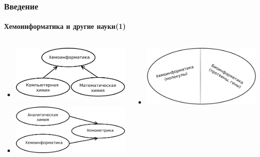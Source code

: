 \begin{frame}
  \frametitle{Введение}
  \framesubtitle{Хемоинформатика и другие науки(1)}
  \begin{columns}
    \begin{column}{0.5\textwidth}
      \begin{itemize}
   \item  \includegraphics[scale=0.32]{images/Diagram1.pdf}
   \item  \includegraphics[scale=0.3]{images/Diagram3.pdf}
      \end{itemize}
    \end{column}
    \begin{column}{0.5\textwidth}      
      \begin{itemize}
      \item \includegraphics[scale=0.3]{images/Diagram2.pdf}

\end{itemize}
\end{column}
\end{columns}
\end{frame}
